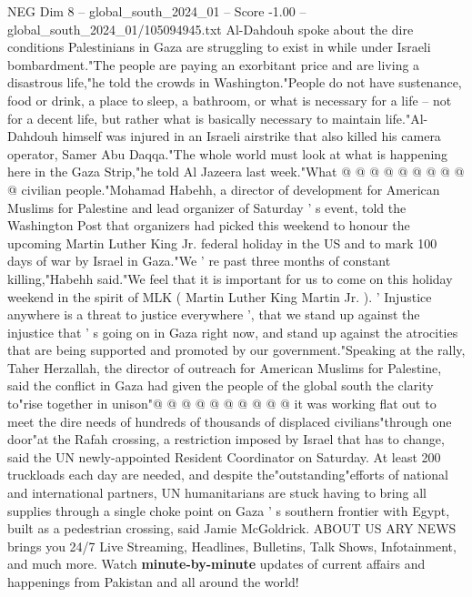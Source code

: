 \begin{textsample}{NEG Dim 8 – global\_south\_2024\_01 – Score -1.00 – global\_south\_2024\_01/105094945.txt}
Al-Dahdouh spoke about the dire conditions Palestinians in Gaza are struggling to exist in while under Israeli bombardment."The people are paying an exorbitant price and are living a disastrous life,"he told the crowds in Washington."People do not have sustenance, food or drink, a place to sleep, a bathroom, or what is necessary for a life -- not for a decent life, but rather what is basically necessary to maintain life."Al-Dahdouh himself was injured in an Israeli airstrike that also killed his camera operator, Samer Abu Daqqa."The whole world must look at what is happening here in the Gaza Strip,"he told Al Jazeera last week."What @ @ @ @ @ @ @ @ @ @ civilian people."Mohamad Habehh, a director of development for American Muslims for Palestine and lead organizer of Saturday ' s event, told the Washington Post that organizers had picked this weekend to honour the upcoming Martin Luther King Jr. federal holiday in the US and to mark 100 days of war by Israel in Gaza."We ' re past three months of constant killing,"Habehh said."We feel that it is important for us to come on this holiday weekend in the spirit of MLK ( Martin Luther King Martin Jr. ). ' Injustice anywhere is a threat to justice everywhere ', that we stand up against the injustice that ' s going on in Gaza right now, and stand up against the atrocities that are being supported and promoted by our government."Speaking at the rally, Taher Herzallah, the director of outreach for American Muslims for Palestine, said the conflict in Gaza had given the people of the global south the clarity to"rise together in unison"@ @ @ @ @ @ @ @ @ @ it was working flat out to meet the dire needs of hundreds of thousands of displaced civilians"through one door"at the Rafah crossing, a restriction imposed by Israel that has to change, said the UN newly-appointed Resident Coordinator on Saturday.
At least 200 truckloads each day are needed, and despite the"outstanding"efforts of national and international partners, UN humanitarians are stuck having to bring all supplies through a single choke point on Gaza ' s southern frontier with Egypt, built as a pedestrian crossing, said Jamie McGoldrick.
ABOUT US ARY NEWS brings you 24/7 Live Streaming, Headlines, Bulletins, Talk Shows, Infotainment, and much more.
Watch \textbf{minute-by-minute} updates of current affairs and happenings from Pakistan and all around the world!

\end{textsample}
